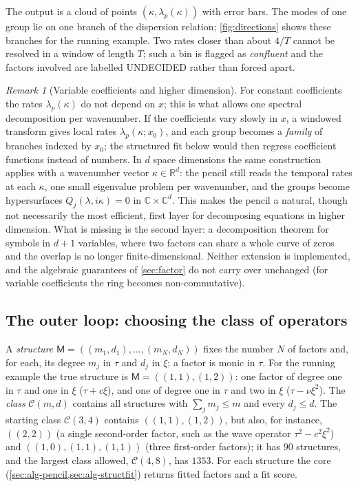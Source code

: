 \documentclass[11pt]{article}
\theoremstyle{plain}
\theoremstyle{definition}
\theoremstyle{remark}
\newtheorem{remark}[theorem]{Remark}
\newcommand{\R}{\mathbb{R}}
\newcommand{\C}{\mathbb{C}}
\newcommand{\Mfit}{\mathsf{M}}              %
\newcommand{\lab}[1]{\textsf{#1}}           %
\newcommand{\UND}{\lab{UNDECIDED}}
\begin{document}
The output is a cloud of points $(\kappa,\lambda_p(\kappa))$ with error bars. The modes of one group lie
on one branch of the dispersion relation; \cref{fig:directions} shows these branches for the
running example. Two rates closer than about $4/T$ cannot be resolved in a window of length $T$; such
a bin is flagged as \emph{confluent} and the factors involved are labelled \UND{} rather than forced
apart.

\begin{remark}[Variable coefficients and higher dimension]\label{rem:varcoef}
For constant coefficients the rates $\lambda_p(\kappa)$ do not depend on $x$; this is what allows one
spectral decomposition per wavenumber. If the coefficients vary slowly in $x$, a windowed transform
gives local rates $\lambda_p(\kappa;x_0)$, and each group becomes a \emph{family} of branches indexed by
$x_0$; the structured fit below would then regress coefficient functions instead of numbers. In $d$ space dimensions
the same construction applies with a wavenumber vector $\kappa\in\R^d$: the pencil still reads the temporal rates at
each $\kappa$, one small eigenvalue problem per wavenumber, and the groups become hypersurfaces $Q_j(\lambda,i\kappa)=0$
in $\C\times\C^d$. This makes the pencil a natural, though not necessarily the most efficient, first layer for
decomposing equations in higher dimension. What is missing is the second layer: a decomposition theorem for symbols in
$d+1$ variables, where two factors can share a whole curve of zeros and the overlap is no longer finite-dimensional.
Neither extension is implemented, and the algebraic guarantees of \cref{sec:factor} do not carry over unchanged
(for variable coefficients the ring becomes non-commutative).
\end{remark}



\subsection{The outer loop: choosing the class of operators}\label{sec:alg-loop}
A \emph{structure} $\Mfit=((m_1,d_1),\dots,(m_N,d_N))$ fixes the number $N$ of factors and, for each,
its degree $m_j$ in $\tau$ and $d_j$ in $\xi$; a factor is monic in $\tau$. For the running example the true structure is
$\Mfit=((1,1),(1,2))$: one factor of degree one in $\tau$ and one in $\xi$ ($\tau+c\xi$), and one of degree one in $\tau$
and two in $\xi$ ($\tau-\nu\xi^2$). The \emph{class} $\mathcal C(m,d)$ contains all structures with $\sum_jm_j\le m$ and
every $d_j\le d$. The starting class $\mathcal C(3,4)$ contains $((1,1),(1,2))$, but also, for instance, $((2,2))$ (a single
second-order factor, such as the wave operator $\tau^2-c^2\xi^2$) and $((1,0),(1,1),(1,1))$ (three first-order factors);
it has $90$ structures, and the largest class allowed, $\mathcal C(4,8)$, has $1353$. For each structure the core
(\cref{sec:alg-pencil,sec:alg-structfit}) returns fitted factors and a fit score.
\end{document}
